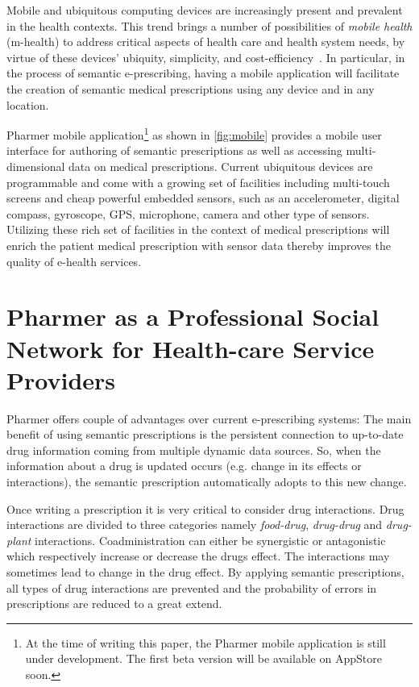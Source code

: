 \documentclass[journal]{IEEEtran}
\begin{document}
Mobile and ubiquitous computing devices are increasingly present and prevalent in the health contexts.
This trend brings a number of possibilities of \emph{mobile health} (m-health) to address critical aspects of health care and health system needs, by virtue of these devices’ ubiquity, simplicity, and cost-efficiency~\cite{mHealth}.
In particular, in the process of semantic e-prescribing, having a mobile application will facilitate the creation of semantic medical prescriptions using any device and in any location.

Pharmer mobile application\footnote{ At the time of writing this paper, the Pharmer mobile application is still under development. The first beta version will be available on AppStore soon.} as shown in \autoref{fig:mobile} provides a mobile user interface for authoring of semantic prescriptions as well as accessing multi-dimensional data on medical prescriptions.
Current ubiquitous devices are programmable and come with a growing set of facilities including multi-touch screens and cheap powerful embedded sensors, such as an accelerometer, digital compass, gyroscope, GPS, microphone, camera and other type of sensors.
Utilizing these rich set of facilities in the context of medical prescriptions will enrich the patient medical prescription with sensor data thereby improves the quality of e-health services.

\section{Pharmer as a Professional Social Network for Health-care Service Providers}
\label{Pharmernet}
Pharmer offers couple of advantages over current e-prescribing systems:
The main benefit of using semantic prescriptions is the persistent connection to up-to-date drug information coming from multiple dynamic data sources.
So, when the information about a drug is updated occurs (e.g. change in its effects or interactions), the semantic prescription automatically adopts to this new change.

Once writing a prescription it is very critical to consider drug interactions.
Drug interactions are divided to three categories namely \emph{food-drug}, \emph{drug-drug} and \emph{drug-plant} interactions.
Coadministration can either be synergistic or antagonistic which respectively increase or decrease the drugs effect.
The interactions may sometimes lead to change in the drug effect.
By applying semantic prescriptions, all types of drug interactions are prevented and the probability of errors in prescriptions are reduced to a great extend.
\end{document}
